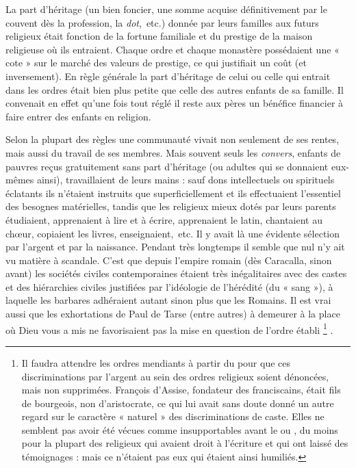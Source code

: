  La part d'héritage (un bien foncier, une somme acquise définitivement par le couvent dès la profession, la \emph{dot},~etc.) donnée par leurs familles aux futurs religieux était fonction de la fortune familiale et du prestige de la maison religieuse où ils entraient. Chaque ordre et chaque monastère possédaient une « cote » sur le marché des valeurs de prestige, ce qui justifiait un coût (et inversement). En règle générale la part d'héritage de celui ou celle qui entrait dans les ordres était bien plus petite que celle des autres enfants de sa famille. Il convenait en effet qu'une fois tout réglé il reste aux pères un bénéfice financier à faire entrer des enfants en religion. 

 Selon la plupart des règles une communauté vivait non seulement de ses rentes, mais aussi du travail de ses membres. Mais souvent seuls les \emph{convers}, enfants de pauvres reçus gratuitement sans part d'héritage (ou adultes qui se donnaient eux-mêmes ainsi), travaillaient de leurs mains : sauf dons intellectuels ou spirituels éclatants ils n'étaient instruits que superficiellement et ils effectuaient l'essentiel des besognes matérielles, tandis que les religieux mieux dotés par leurs parents étudiaient, apprenaient à lire et à écrire, apprenaient le latin, chantaient au chœur, copiaient les livres, enseignaient,~etc. Il y avait là une évidente sélection par l'argent et par la naissance. Pendant très longtemps il semble que nul n'y ait vu matière à scandale. C'est que depuis l'empire romain (dès Caracalla, sinon avant) les sociétés civiles contemporaines étaient très inégalitaires avec des castes et des hiérarchies civiles justifiées par l'idéologie de l'hérédité (du « sang »), à laquelle les barbares adhéraient autant sinon plus que les Romains. Il est vrai aussi que les exhortations de Paul de Tarse (entre autres) à demeurer à la place où Dieu vous a mis ne favorisaient pas la mise en question de l'ordre établi%
\footnote{Il faudra attendre les ordres mendiants à partir du  pour que ces discriminations par l'argent au sein des ordres religieux soient dénoncées, mais non supprimées. François d'Assise, fondateur des franciscains, était fils de bourgeois, non d'aristocrate, ce qui lui avait sans doute donné un autre regard sur le caractère « naturel » des discriminations de caste. Elles ne semblent pas avoir été vécues comme insupportables avant le  ou , du moins pour la plupart des religieux qui avaient droit à l'écriture et qui ont laissé des témoignages : mais ce n'étaient pas eux qui étaient ainsi humiliés.}%
. 

